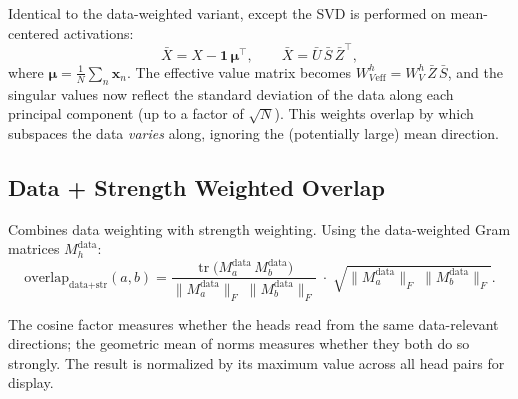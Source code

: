 \documentclass[11pt]{article}
\newcommand{\WV}{W_V}
\newcommand{\frob}[1]{\lVert #1 \rVert_F}
\newcommand{\tr}{\operatorname{tr}}
\begin{document}
Identical to the data-weighted variant, except the SVD is performed on mean-centered activations:
\[
    \bar{X} = X - \mathbf{1}\, \bm{\mu}^\top, \qquad \bar{X} = \bar{U}\, \bar{S}\, \bar{Z}^\top,
\]
where $\bm{\mu} = \frac{1}{N}\sum_n \bm{x}_n$. The effective value matrix becomes $\WV^h_{\text{eff}} = \WV^h\, \bar{Z}\, \bar{S}$, and the singular values now reflect the standard deviation of the data along each principal component (up to a factor of $\sqrt{N}$). This weights overlap by which subspaces the data \emph{varies} along, ignoring the (potentially large) mean direction.

\subsection{Data + Strength Weighted Overlap}

Combines data weighting with strength weighting. Using the data-weighted Gram matrices $M_h^{\text{data}}$:
\[
    \text{overlap}_{\text{data+str}}(a,b) = \frac{\tr\!\bigl(M_a^{\text{data}}\, M_b^{\text{data}}\bigr)}{\frob{M_a^{\text{data}}}\;\frob{M_b^{\text{data}}}} \;\cdot\; \sqrt{\frob{M_a^{\text{data}}}\;\frob{M_b^{\text{data}}}}.
\]

The cosine factor measures whether the heads read from the same data-relevant directions; the geometric mean of norms measures whether they both do so strongly. The result is normalized by its maximum value across all head pairs for display.
\end{document}
